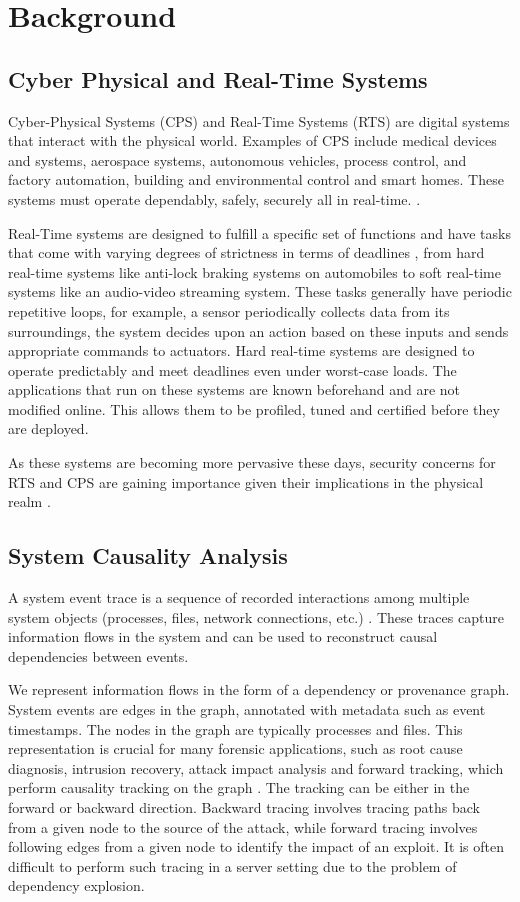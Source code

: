 \section{Background}
\label{sec:background}

\subsection{Cyber Physical and Real-Time Systems}
Cyber-Physical Systems (CPS) and Real-Time Systems (RTS) are digital systems that interact with the physical world. Examples of CPS include medical devices and systems, aerospace systems, autonomous vehicles, process control, and factory automation, building and environmental control and smart homes. These systems must operate dependably, safely, securely all in real-time. \cite{2010cps}.

Real-Time systems are designed to fulfill a specific set of functions and have tasks that come with varying degrees of strictness in terms of deadlines \cite{liu_rt}, from hard real-time systems like anti-lock braking systems on automobiles to soft real-time systems like an audio-video streaming system. These tasks generally have periodic repetitive loops, for example, a sensor periodically collects data from its surroundings, the system decides upon an action based on these inputs and sends appropriate commands to actuators. Hard real-time systems are designed to operate predictably and meet deadlines even under worst-case loads. The applications that run on these systems are known beforehand and are not modified online. This allows them to be profiled, tuned and certified before they are deployed.

As these systems are becoming more pervasive these days, security concerns for RTS and CPS are gaining importance given their implications in the physical realm \cite{karim2014cps_sec,2010cps}.

\subsection{System Causality Analysis}

A system event trace is a sequence of recorded interactions among multiple system objects (processes, files, network connections, etc.) \cite{XuCCS16}. These traces capture information flows in the system and can be used to reconstruct causal dependencies between events.

We represent information flows in the form of a dependency or provenance graph. System events are edges in the graph, annotated with metadata such as event timestamps. The nodes in the graph are typically processes and files. This representation is crucial for many forensic applications, such as root cause diagnosis, intrusion recovery, attack impact analysis and forward tracking, which perform causality tracking on the graph \cite{XuCCS16}. The tracking can be either in the forward or backward direction. Backward tracing involves tracing paths back from a given node to the source of the attack, while forward tracing involves following edges from a given node to identify the impact of an exploit. It is often difficult to perform such tracing in a server setting due to the problem of dependency explosion\cite{LeeZX13}.

